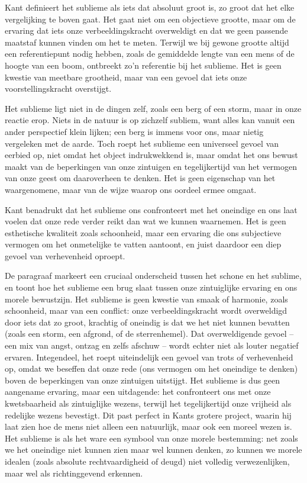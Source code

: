 \begin{mdframed}[leftmargin=0pt,rightmargin=0pt,backgroundcolor=blue!6,linecolor=white,innertopmargin=6pt,innerbottommargin=6pt]

Kant definieert het sublieme als iets dat absoluut groot is, zo groot dat het elke vergelijking te boven gaat. Het gaat niet om een objectieve grootte, maar om de ervaring dat iets onze verbeeldingskracht overweldigt en dat we geen passende maatstaf kunnen vinden om het te meten. Terwijl we bij gewone grootte altijd een referentiepunt nodig hebben, zoals de gemiddelde lengte van een mens of de hoogte van een boom, ontbreekt zo’n referentie bij het sublieme. Het is geen kwestie van meetbare grootheid, maar van een gevoel dat iets onze voorstellingskracht overstijgt.

Het sublieme ligt niet in de dingen zelf, zoals een berg of een storm, maar in onze reactie erop. Niets in de natuur is op zichzelf subliem, want alles kan vanuit een ander perspectief klein lijken; een berg is immens voor ons, maar nietig vergeleken met de aarde. Toch roept het sublieme een universeel gevoel van eerbied op, niet omdat het object indrukwekkend is, maar omdat het ons bewust maakt van de beperkingen van onze zintuigen en tegelijkertijd van het vermogen van onze geest om daaroverheen te denken. Het is geen eigenschap van het waargenomene, maar van de wijze waarop ons oordeel ermee omgaat.

Kant benadrukt dat het sublieme ons confronteert met het oneindige en ons laat voelen dat onze rede verder reikt dan wat we kunnen waarnemen. Het is geen esthetische kwaliteit zoals schoonheid, maar een ervaring die ons subjectieve vermogen om het onmetelijke te vatten aantoont, en juist daardoor een diep gevoel van verhevenheid oproept.

\bigskip
De paragraaf markeert een cruciaal onderscheid tussen het schone en het sublime, en toont hoe het sublieme een brug slaat tussen onze zintuiglijke ervaring en ons morele bewustzijn. Het sublieme is geen kwestie van smaak of harmonie, zoals schoonheid, maar van een conflict: onze verbeeldingskracht wordt overweldigd door iets dat zo groot, krachtig of oneindig is dat we het niet kunnen bevatten (zoals een storm, een afgrond, of de sterrenhemel). Dat overweldigende gevoel – een mix van angst, ontzag en zelfs afschuw – wordt echter niet als louter negatief ervaren. Integendeel, het roept uiteindelijk een gevoel van trots of verhevenheid op, omdat we beseffen dat onze rede (ons vermogen om het oneindige te denken) boven de beperkingen van onze zintuigen uitstijgt. Het sublieme is dus geen aangename ervaring, maar een uitdagende: het confronteert ons met onze kwetsbaarheid als zintuiglijke wezens, terwijl het tegelijkertijd onze vrijheid als redelijke wezens bevestigt. Dit past perfect in Kants grotere project, waarin hij laat zien hoe de mens niet alleen een natuurlijk, maar ook een moreel wezen is. Het sublieme is als het ware een symbool van onze morele bestemming: net zoals we het oneindige niet kunnen zien maar wel kunnen denken, zo kunnen we morele idealen (zoals absolute rechtvaardigheid of deugd) niet volledig verwezenlijken, maar wel als richtinggevend erkennen.


\end{mdframed}
